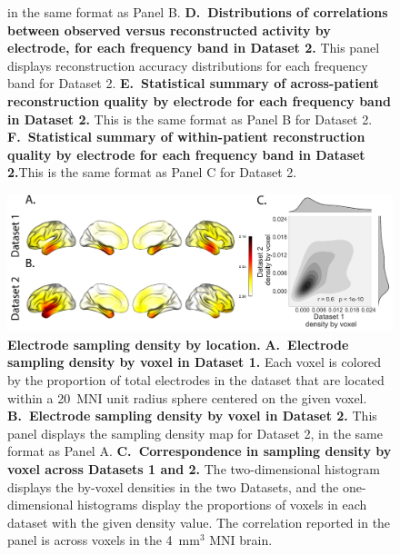 \documentclass[11pt]{article}
\begin{document}
\begin{figure}
{    in the same format as Panel B.  \textbf{D.~Distributions of correlations
      between observed versus reconstructed activity by electrode, for
      each frequency band in Dataset 2.}  This panel displays
    reconstruction accuracy distributions for each frequency band for
    Dataset 2. \textbf{E.~Statistical summary of
      across-patient reconstruction quality by electrode for each
      frequency band in Dataset 2.} This is the same format as Panel
    B for Dataset 2. \textbf{F.~Statistical summary of
      within-patient reconstruction quality by electrode for each
      frequency band in Dataset 2.}This is the same format as Panel
    C for Dataset 2.}
  \label{fig:frequency}
\end{figure}


\begin{figure}
  \centering
  \includegraphics[width=\textwidth]{figs/density}
  \caption{\textbf{Electrode sampling density by location.}
    \textbf{A.~Electrode sampling density by voxel in Dataset 1.} Each
    voxel is colored by the proportion of total electrodes in the
    dataset that are
    located within a 20~MNI unit radius sphere centered on the given
    voxel.  \textbf{B.~Electrode sampling density by voxel in Dataset
      2.}  This panel displays the sampling density map for Dataset 2,
    in the same format as Panel A.  \textbf{C.~Correspondence in
      sampling density by voxel across Datasets 1 and 2.}  The
    two-dimensional histogram displays the by-voxel densities in the
    two Datasets, and the one-dimensional histograms display the
    proportions of voxels in each dataset with the given density
    value.  The correlation reported in the panel is across voxels in
    the 4~mm$^3$ MNI brain.}
  \label{fig:density}
\end{figure}
\end{document}
